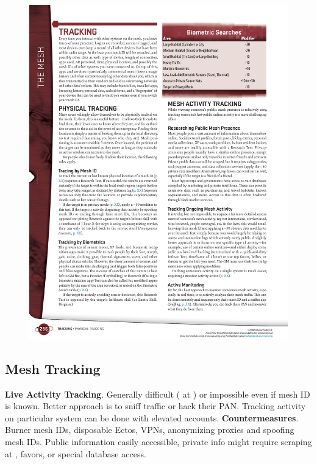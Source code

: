 \begin{figure}[htbp!]%
   \centering
   \includegraphics[scale=1.0]{gfx/mesh-search-biometric}%
\end{figure}%

\subsection*{Mesh Tracking}

\begin{itemize}
   \itembox \textbf{Live Activity Tracking}. Generally difficult ( at ) or impossible even if mesh ID is known. Better approach is to sniff traffic or hack their PAN. Tracking activity on particular system can be done with elevated accounts.
   \itembox \textbf{Countermeasures}. Burner mesh IDs, disposable Ectos, VPNs, anonymizing proxies and spoofing mesh IDs.
   \itembox Public information easily accessible, private info might require  scraping at , favors, or special database access.
\end{itemize}


